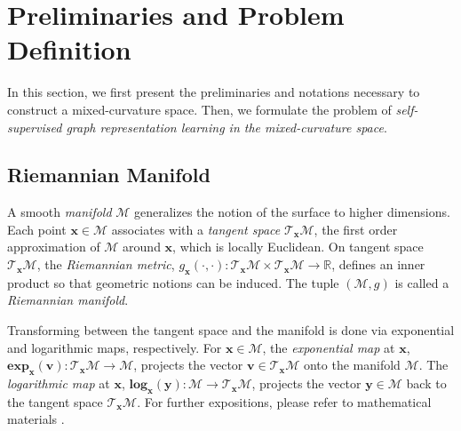 
\section{Preliminaries and Problem Definition}

In this section, we first present the preliminaries and notations necessary to construct a mixed-curvature space.
Then, we formulate the problem of \emph{self-supervised graph representation learning in the mixed-curvature space}.


\subsection{Riemannian Manifold}

A smooth \emph{manifold} $\mathcal M$ generalizes the notion of the surface to higher dimensions.
Each point $\mathbf x \in \mathcal M$ associates with a \emph{tangent space} $\mathcal T_\mathbf x\mathcal M$, the first order approximation of $\mathcal M$ around $\mathbf x$, which is locally Euclidean.
On tangent space $\mathcal T_\mathbf x\mathcal M$, the \emph{Riemannian metric}, $g_\mathbf x (\cdot, \cdot) : \mathcal T_\mathbf x\mathcal M  \times \mathcal T_\mathbf x\mathcal M \to \mathbb R$, defines an inner product so that geometric notions can be induced.
The tuple $(\mathcal M, g)$ is called a \emph{Riemannian manifold}.

Transforming between the tangent space and the manifold is done via exponential and logarithmic maps, respectively.
For $\mathbf x \in \mathcal M$, 
the  \emph{exponential map} at $\mathbf x$, 
$\mathbf{exp}_\mathbf x(\mathbf v): \mathcal T_\mathbf x\mathcal M \to \mathcal M$, 
projects the vector $\mathbf v \in \mathcal T_\mathbf x\mathcal M$ onto the manifold $\mathcal M$.
The \emph{logarithmic map} at $\mathbf x$, 
$\mathbf{log}_\mathbf x(\mathbf y): \mathcal M \to \mathcal T_\mathbf x\mathcal M$, 
projects the vector $\mathbf y \in \mathcal M$ back to the tangent space $\mathcal T_\mathbf x\mathcal M$.
For further expositions, please refer to mathematical materials \cite{Spivak1979,Hopper2010}.

